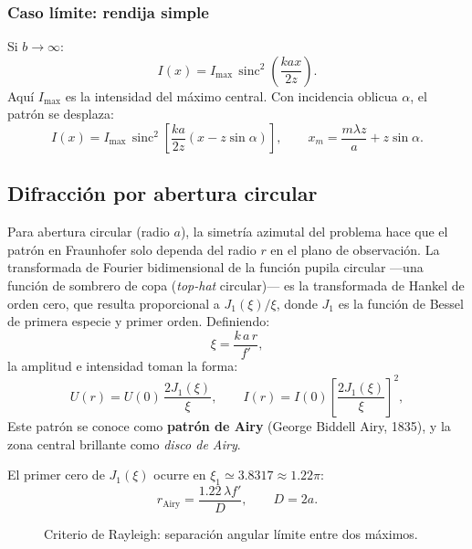 \documentclass[12pt, a4paper]{article}
\theoremstyle{plain}
\theoremstyle{definition}
\theoremstyle{remark}
\begin{document}
\subsubsection{Caso límite: rendija simple}

Si $b\to\infty$:
\begin{equation}
  I(x)=I_{\max}\,
  \operatorname{sinc}^2\!\left(\frac{kax}{2z}\right).
  \label{eq:rendija_simple_t5}
\end{equation}
Aquí $I_{\max}$ es la intensidad del máximo central.
Con incidencia oblicua $\alpha$, el patrón se desplaza:
\begin{equation}
  I(x)=I_{\max}\,
  \operatorname{sinc}^2\!\left[\frac{ka}{2z}\left(x-z\sin\alpha\right)\right],
  \qquad
  x_m=\frac{m\lambda z}{a}+z\sin\alpha.
  \label{eq:rendija_oblicua_t5}
\end{equation}

\subsection{Difracción por abertura circular}

Para abertura circular (radio $a$), la simetría azimutal del problema hace que el
patrón en Fraunhofer solo dependa del radio $r$ en el plano de observación. La
transformada de Fourier bidimensional de la función pupila circular —una función
de sombrero de copa (\emph{top-hat} circular)— es la transformada de Hankel de
orden cero, que resulta proporcional a $J_1(\xi)/\xi$, donde $J_1$ es la función
de Bessel de primera especie y primer orden. Definiendo:
\[
  \xi=\frac{k\,a\,r}{f'},
\]
la amplitud e intensidad toman la forma:
\begin{equation}
  U(r)=U(0)\,\frac{2J_1(\xi)}{\xi},
  \qquad
  I(r)=I(0)\left[\frac{2J_1(\xi)}{\xi}\right]^2,
  \label{eq:airy_t5}
\end{equation}
Este patrón se conoce como \textbf{patrón de Airy} (George Biddell Airy, 1835), y
la zona central brillante como \emph{disco de Airy}.

El primer cero de $J_1(\xi)$ ocurre en $\xi_1\simeq 3.8317 \approx 1.22\pi$:
\begin{equation}
  r_{\text{Airy}}=\frac{1.22\,\lambda f'}{D},
  \qquad D=2a.
  \label{eq:radio_airy_t5}
\end{equation}

\begin{figure}[ht]
  \centering
  \caption{Criterio de Rayleigh: separación angular límite entre dos máximos.}
  \label{fig:rayleigh_t5}
\end{figure}
\end{document}
